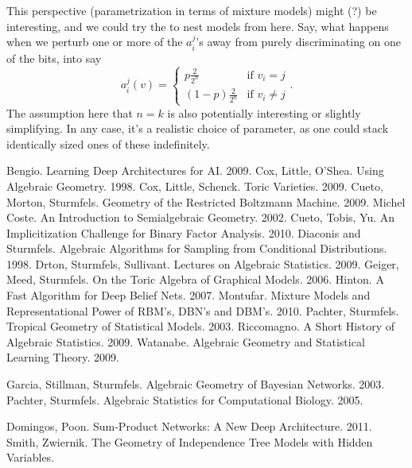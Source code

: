 \documentclass[11pt]{article}
\begin{document}
This perspective (parametrization in terms of mixture models) might (?) be
interesting, and we could try the to nest models from here.  Say, what happens
when we perturb one or more of the $a_i^j$'s away from purely discriminating on
one of the bits, into say
\[
    a_i^j(v) = \begin{cases}
        p\frac{2}{2^n} & \text{if $v_i = j$}\\
        (1 - p)\frac{2}{2^n} & \text{if $v_i \ne j$}
    \end{cases}.
\]
The assumption here that $n=k$ is also potentially interesting or slightly
simplifying.  In any case, it's a realistic choice of parameter, as one could
stack identically sized ones of these indefinitely.

\begin{thebibliography}{100}
     Bengio.  Learning Deep Architectures for AI. 2009.
     Cox, Little, O'Shea.  Using Algebraic Geometry.  1998.
     Cox, Little, Schenck.  Toric Varieties.  2009.
     Cueto, Morton, Sturmfels. Geometry of the Restricted Boltzmann Machine.  2009.
     Michel Coste.  An Introduction to Semialgebraic Geometry.  2002.
     Cueto, Tobis, Yu.  An Implicitization Challenge for Binary Factor Analysis. 2010.
     Diaconis and Sturmfels.  Algebraic Algorithms for Sampling
    from Conditional Distributions. 1998.
     Drton, Sturmfels, Sullivant. Lectures on Algebraic
    Statistics. 2009.
     Geiger, Meed, Sturmfels.  On the Toric Algebra of Graphical Models. 2006.
     Hinton.  A Fast Algorithm for Deep Belief Nets.  2007.
     Montufar.  Mixture Models and Representational Power of
    RBM's, DBN's and DBM's.  2010.
     Pachter, Sturmfels.  Tropical Geometry of Statistical Models. 2003.
     Riccomagno.  A Short History of Algebraic Statistics.  2009.
     Watanabe.  Algebraic Geometry and Statistical Learning Theory.  2009.

     Garcia, Stillman, Sturmfels.  Algebraic Geometry of Bayesian Networks.  2003.
     Pachter, Sturmfels.  Algebraic Statistics for Computational Biology.  2005.

     Domingos, Poon. Sum-Product Networks: A New Deep Architecture. 2011.
     Smith, Zwiernik.  The Geometry of Independence Tree Models with Hidden Variables.
\end{thebibliography}
\end{document}
